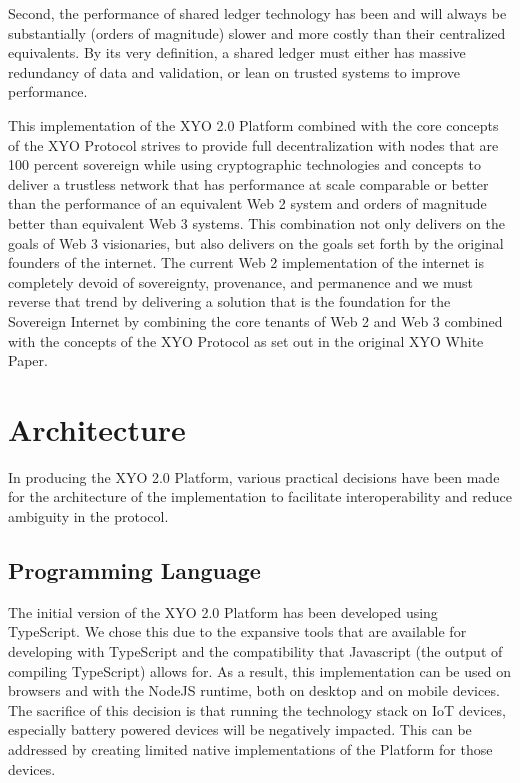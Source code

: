 \documentclass{article}
\begin{document}
Second, the performance of shared ledger technology has been and will always be substantially (orders of magnitude) slower and more costly than their centralized equivalents.  By its very definition, a shared ledger must either has massive redundancy of data and validation, or lean on trusted systems to improve performance.

This implementation of the XYO 2.0 Platform combined with the core concepts of the XYO Protocol strives to provide full decentralization with nodes that are 100 percent sovereign while using cryptographic technologies and concepts to deliver a trustless network that has performance at scale comparable or better than the performance of an equivalent Web 2 system and orders of magnitude better than equivalent Web 3 systems.  This combination not only delivers on the goals of Web 3 visionaries, but also delivers on the goals set forth by the original founders of the internet. The current Web 2 implementation of the internet is completely devoid of sovereignty, provenance, and permanence and we must reverse that trend by delivering a solution that is the foundation for the Sovereign Internet by combining the core tenants of Web 2 and Web 3 combined with the concepts of the XYO Protocol as set out in the original XYO White Paper.

\clearpage
\section{Architecture}
In producing the XYO 2.0 Platform, various practical decisions have been made for the architecture of the implementation to facilitate interoperability and reduce ambiguity in the protocol.

\subsection{Programming Language}
The initial version of the XYO 2.0 Platform has been developed using TypeScript.  We chose this due to the expansive tools that are available for developing with TypeScript and the compatibility that Javascript (the output of compiling TypeScript) allows for.  As a result, this implementation can be used on browsers and with the NodeJS runtime, both on desktop and on mobile devices.  The sacrifice of this decision is that running the technology stack on IoT devices, especially battery powered devices will be negatively impacted.  This can be addressed by creating limited native implementations of the Platform for those devices.
\end{document}
